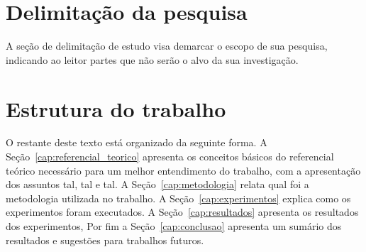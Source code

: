 \section{Delimitação da pesquisa}

A seção de delimitação de estudo visa demarcar o escopo de sua pesquisa, indicando ao leitor partes que não serão o alvo da sua investigação.

\section{Estrutura do trabalho}

O restante deste texto está organizado da seguinte forma. A Seção~\ref{cap:referencial_teorico} apresenta os conceitos básicos do referencial teórico necessário para um melhor entendimento do trabalho, com a apresentação dos assuntos tal, tal e tal. A Seção~\ref{cap:metodologia} relata qual foi a metodologia utilizada no trabalho. A Seção~\ref{cap:experimentos} explica como os experimentos foram executados. A Seção~\ref{cap:resultados} apresenta os resultados dos experimentos, Por fim a Seção~\ref{cap:conclusao} apresenta um sumário dos resultados e sugestões para trabalhos futuros.